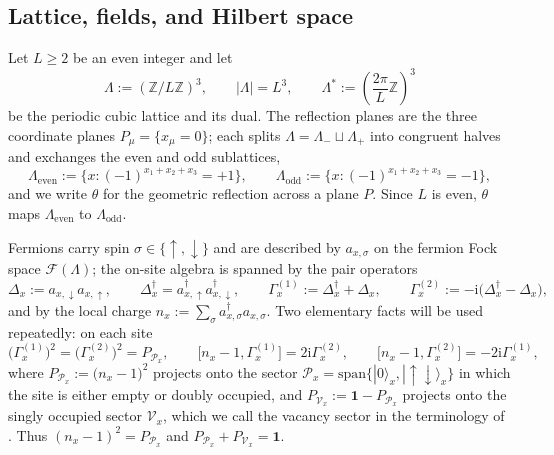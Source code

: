 \documentclass[11pt]{article}
\numberwithin{equation}{section}
\newcommand{\ii}{\mathrm{i}}
\newcommand{\id}{\mathbf{1}}
\newcommand{\Z}{\mathbb{Z}}
\newcommand{\Lamb}{\Lambda}
\newcommand{\Lambstar}{\Lambda^{*}}
\newcommand{\Gam}{\Gamma}
\theoremstyle{definition}
\begin{document}
\subsection{Lattice, fields, and Hilbert space}

Let $L\ge2$ be an even integer and let
\begin{equation}
\Lamb:=\left(\Z/L\Z\right)^{3},\qquad |\Lamb|=L^{3},\qquad \Lambstar:=\left(\frac{2\pi}{L}\Z\right)^{3}
\end{equation}
be the periodic cubic lattice and its dual. The reflection planes are the three
coordinate planes $P_{\mu}=\{x_{\mu}=0\}$; each splits
$\Lamb=\Lamb_{-}\sqcup\Lamb_{+}$ into congruent halves and exchanges the even and odd
sublattices,
\begin{equation}
\Lamb_{\text{even}}:=\{x:(-1)^{x_{1}+x_{2}+x_{3}}=+1\},\qquad
\Lamb_{\text{odd}}:=\{x:(-1)^{x_{1}+x_{2}+x_{3}}=-1\},
\end{equation}
and we write $\theta$ for the geometric reflection across a plane $P$. Since $L$ is
even, $\theta$ maps $\Lamb_{\text{even}}$ to $\Lamb_{\text{odd}}$.

Fermions carry spin $\sigma\in\{\uparrow,\downarrow\}$ and are described by
$a_{x,\sigma}$ on the fermion Fock space $\mathcal{F}(\Lamb)$; the on-site algebra is
spanned by the pair operators
\begin{equation}
\Delta_{x}:=a_{x,\downarrow}a_{x,\uparrow},\qquad
\Delta_{x}^{\dagger}=a_{x,\uparrow}^{\dagger}a_{x,\downarrow}^{\dagger},\qquad
\Gam^{(1)}_{x}:=\Delta_{x}^{\dagger}+\Delta_{x},\qquad
\Gam^{(2)}_{x}:=-\ii\big(\Delta_{x}^{\dagger}-\Delta_{x}\big),
\label{eq:gamma-def}
\end{equation}
and by the local charge $n_{x}:=\sum_{\sigma}a^{\dagger}_{x,\sigma}a_{x,\sigma}$. Two
elementary facts will be used repeatedly: on each site
\begin{equation}
\big(\Gam^{(1)}_{x}\big)^{2}=\big(\Gam^{(2)}_{x}\big)^{2}=P_{\mathcal{P}_{x}},\qquad
\big[n_{x}-1,\Gam^{(1)}_{x}\big]=2\ii\Gam^{(2)}_{x},\qquad
\big[n_{x}-1,\Gam^{(2)}_{x}\big]=-2\ii\Gam^{(1)}_{x},
\label{eq:local-ids}
\end{equation}
where $P_{\mathcal{P}_{x}}:=\big(n_{x}-1\big)^{2}$ projects onto the sector
$\mathcal{P}_{x}=\mathrm{span}\{|0\rangle_{x},|\uparrow\downarrow\rangle_{x}\}$ in which
the site is either empty or doubly occupied, and
$P_{\mathcal{V}_{x}}:=\id-P_{\mathcal{P}_{x}}$ projects onto the singly occupied
sector $\mathcal{V}_{x}$, which we call the vacancy sector in the terminology of
\cite{rens2026pkodlro}. Thus $(n_{x}-1)^{2}=P_{\mathcal{P}_{x}}$ and
$P_{\mathcal{P}_{x}}+P_{\mathcal{V}_{x}}=\id$.
\end{document}
